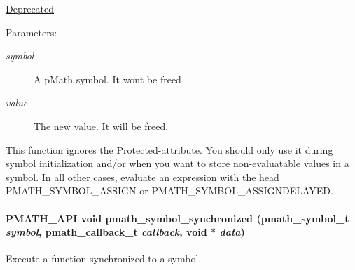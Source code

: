 \begin{Desc}
\item[\hyperlink{deprecated__deprecated000002}{Deprecated}]\end{Desc}
\begin{Desc}
\item[Parameters:]
\begin{description}
\item[{\em symbol}]A pMath symbol. It wont be freed \item[{\em value}]The new value. It will be freed.\end{description}
\end{Desc}
This function ignores the Protected-attribute. You should only use it during symbol initialization and/or when you want to store non-evaluatable values in a symbol. In all other cases, evaluate an expression with the head PMATH\_\-SYMBOL\_\-ASSIGN or PMATH\_\-SYMBOL\_\-ASSIGNDELAYED. \hypertarget{group__symbols_g95b141d9cb33fba80d6a807f304ee3b7}{
\paragraph[{pmath\_\-symbol\_\-synchronized}]{\setlength{\rightskip}{0pt plus 5cm}PMATH\_\-API void pmath\_\-symbol\_\-synchronized ({\bf pmath\_\-symbol\_\-t} {\em symbol}, \/  {\bf pmath\_\-callback\_\-t} {\em callback}, \/  void $\ast$ {\em data})}\hfill}
\label{group__symbols_g95b141d9cb33fba80d6a807f304ee3b7}


Execute a function synchronized to a symbol. 

